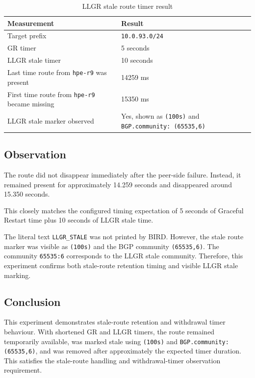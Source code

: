 \begin{table}[H]
\centering
\small
\renewcommand{\arraystretch}{1.25}
\begin{tabular}{|p{6cm}|p{5cm}|}
\hline
\textbf{Measurement} & \textbf{Result} \\
\hline
Target prefix & \texttt{10.0.93.0/24} \\
\hline
GR timer & 5 seconds \\
\hline
LLGR stale timer & 10 seconds \\
\hline
Last time route from \texttt{hpe-r9} was present & 14259 ms \\
\hline
First time route from \texttt{hpe-r9} became missing & 15350 ms \\
\hline
LLGR stale marker observed & Yes, shown as \texttt{(100s)} and \texttt{BGP.community: (65535,6)} \\
\hline
\end{tabular}
\caption{LLGR stale route timer result}
\end{table}

\subsection{Observation}

The route did not disappear immediately after the peer-side failure. Instead, it remained present for approximately 14.259 seconds and disappeared around 15.350 seconds.

This closely matches the configured timing expectation of 5 seconds of Graceful Restart time plus 10 seconds of LLGR stale time.

The literal text \texttt{LLGR\_STALE} was not printed by BIRD. However, the stale route marker was visible as \texttt{(100s)} and the BGP community \texttt{(65535,6)}. The community \texttt{65535:6} corresponds to the LLGR stale community. Therefore, this experiment confirms both stale-route retention timing and visible LLGR stale marking.

\subsection{Conclusion}

This experiment demonstrates stale-route retention and withdrawal timer behaviour. With shortened GR and LLGR timers, the route remained temporarily available, was marked stale using \texttt{(100s)} and \texttt{BGP.community: (65535,6)}, and was removed after approximately the expected timer duration. This satisfies the stale-route handling and withdrawal-timer observation requirement.
